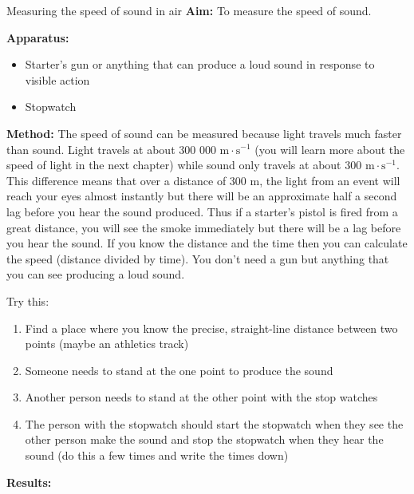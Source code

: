 
\begin{i_experiment}{Measuring the speed of sound in air}
\textbf{Aim:} To measure the speed of sound.

\textbf{Apparatus:} 
\begin{itemize}
 \item Starter's gun or anything that can produce a loud sound in response to visible action
  \item Stopwatch
  \end{itemize}

\textbf{Method:} The speed of sound can be measured because light travels much faster than sound. Light travels at about 300 000 $\text{m}\cdot\text{s}^{-1}$ (you will learn more about the speed of light in the next chapter) while sound only travels at about 300 $\text{m}\cdot\text{s}^{-1}$.  This difference means that over a distance of 300 $\text{m}$, the light from an event will reach your eyes almost instantly but there will be an approximate half a second lag before you hear the sound produced.  Thus if a starter's pistol is fired from a great distance, you will see the smoke immediately but there will be a lag before you hear the sound.  If you know the distance and the time then you can calculate the speed (distance divided by time). You don't need a gun but anything that you can see producing a loud sound.

Try this:
\begin{enumerate}[noitemsep, label=\textbf{\arabic*}. ] 
\item Find a place where you know the precise, straight-line distance between two points (maybe an athletics track)
\item Someone needs to stand at the one point to produce the sound 
\item Another person needs to stand at the other point with the stop watches
\item The person with the stopwatch should start the stopwatch when they see the other person make the sound and stop the stopwatch when they hear the sound (do this a few times and write the times down)
\end{enumerate}
\textbf{Results:}


\end{i_experiment}
